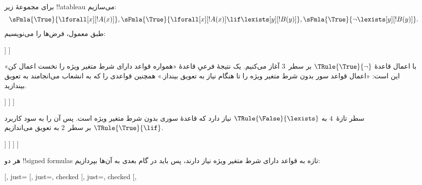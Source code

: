 \documentclass[../../../include/open-logic-section]{subfiles}
\begin{document}
\begin{ex}
برای مجموعهٔ زیر !!a{tableau} می‌سازیم:
\[
\sFmla{\True}{\lforall[x][!A(x)]}, \sFmla{\True}{\lforall[x][!A(x)]
  \lif \lexists[y][!B(y)]}, \sFmla{\True}{\lnot\lexists[y][!B(y)]}.
\]
طبق معمول، فرض‌ها را می‌نویسیم:
\begin{oltableau}
  [\sFmla{\True}{\lforall[x][\formula{A}(x)]}, just=\TAss
    [\sFmla{\True}{\lforall[x][\formula{A}(x)] \lif
        \lexists[y][\formula{B}(y)]}, just=\TAss
      [\sFmla{\True}{\lnot\lexists[y][\formula{B}(y)]}, just=\TAss
      ]
    ]
  ]
\end{oltableau}
با اعمال قاعدهٔ $\TRule{\True}{\lnot}$ بر سطر~$3$ آغاز می‌کنیم. یک
نتیجهٔ فرعیِ قاعدهٔ «همواره قواعد دارای شرط متغیر ویژه را نخست اعمال کن»
این است: «اعمال قواعد سور بدون شرط متغیر ویژه را تا هنگام نیاز به تعویق
بینداز.» همچنین قواعدی را که به انشعاب می‌انجامند به تعویق بیندازید.
\begin{oltableau}
  [\sFmla{\True}{\lforall[x][\formula{A}(x)]}, just=\TAss
    [\sFmla{\True}{\lforall[x][\formula{A}(x)] \lif
        \lexists[y][\formula{B}(y)]}, just=\TAss
      [\sFmla{\True}{\lnot\lexists[y][\formula{B}(y)]}, just=\TAss, checked
        [\sFmla{\False}{\lexists[y][\formula{B}(y)]}, just={\TRule{\True}{\lnot}[3]}]
      ]
    ]
  ]
\end{oltableau}
سطر تازهٔ~$4$ به $\TRule{\False}{\lexists}$ نیاز دارد که قاعدهٔ سوری
بدون شرط متغیر ویژه است. پس آن را به سود کاربرد
$\TRule{\True}{\lif}$ بر سطر~$2$ به تعویق می‌اندازیم.
\begin{oltableau}
  [\sFmla{\True}{\lforall[x][\formula{A}(x)]}, just=\TAss
    [\sFmla{\True}{\lforall[x][\formula{A}(x)] \lif
        \lexists[y][\formula{B}(y)]}, just=\TAss, checked
      [\sFmla{\True}{\lnot\lexists[y][\formula{B}(y)]}, just=\TAss, checked
        [\sFmla{\False}{\lexists[y][\formula{B}(y)]},
          just={\TRule{\True}{\lnot}[3]},
          [\sFmla{\False}{\lforall[x][\formula{A}(x)]}, just={\TRule{\True}{\lif}[2]}]
          [\sFmla{\True}{\lexists[y][\formula{B}(y)]}, just={\TRule{\True}{\lif}[2]}]
        ]
      ]
    ]
  ]
\end{oltableau}
هر دو !!{signed formula}s تازه به قواعد دارای شرط متغیر ویژه نیاز دارند،
پس باید در گام بعدی به آن‌ها بپردازیم:
\begin{oltableau}
  [\sFmla{\True}{\lforall[x][\formula{A}(x)]}, just=\TAss
    [\sFmla{\True}{\lforall[x][\formula{A}(x)] \lif
        \lexists[y][\formula{B}(y)]}, just=\TAss, checked
      [\sFmla{\True}{\lnot\lexists[y][\formula{B}(y)]}, just=\TAss, checked
        [\sFmla{\False}{\lexists[y][\formula{B}(y)]},

\end{oltableau}
\end{ex}
\end{document}
